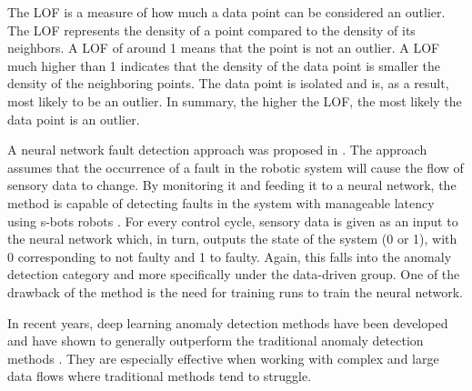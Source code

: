 The \ac{LOF} \cite{breunig2000lof} is a measure of how much a data point can be considered an outlier. The \ac{LOF} represents the density of a point compared to the density of its neighbors. A \ac{LOF} of around 1 means that the point is not an outlier. A \ac{LOF} much higher than 1 indicates that the density of the data point is smaller the density of the neighboring points. The data point is isolated and is, as a result, most likely to be an outlier. In summary, the higher the \ac{LOF}, the most likely the data point is an outlier. 

A neural network fault detection approach was proposed in \cite{christensen2008faultDetection}. The approach assumes that the occurrence of a fault in the robotic system will cause the flow of sensory data to change. By monitoring it and feeding it to a neural network, the method is capable of detecting faults in the system with manageable latency using s-bots robots \cite{mondada2005cooperation}. For every control cycle, sensory data is given as an input to the neural network which, in turn, outputs the state of the system (0 or 1), with 0 corresponding to not faulty and 1 to faulty. Again, this falls into the anomaly detection category and more specifically under the data-driven group. One of the drawback of the method is the need for training runs to train the neural network.

In recent years, deep learning anomaly detection methods have been developed and have shown to generally outperform the traditional anomaly detection methods \cite{pang2021deep}. They are especially effective when working with complex and large data flows where traditional methods tend to struggle.



